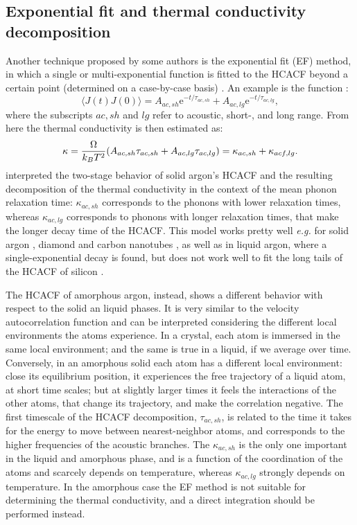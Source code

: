 \begin{LEtext}
\subsection{Exponential fit and thermal conductivity decomposition}
Another technique proposed by some authors is the exponential fit (EF) method, in which a single or multi-exponential function is fitted to the HCACF beyond a certain point (determined on a case-by-case basis) \cite{Che2000a,Li1998,Zhang2015}. An example is the function \cite{Che2000a}:
\begin{equation}
    \langle J(t) J(0) \rangle = A_{ac,sh} \mathrm{e}^{-t/\tau_{ac,sh}} + A_{ac,lg} \mathrm{e}^{-t/\tau_{ac,lg}},
\end{equation}
where the subscripts $ac,sh$ and $lg$ refer to acoustic, short-, and long range. From here the thermal conductivity is then estimated as:
\begin{equation}
    \kappa = \frac{{\mathrm\Omega}}{k_B T^2} (A_{ac,sh}\tau_{ac,sh} + A_{ac,lg}\tau_{ac,lg})  =  \kappa_{ac,sh} + \kappa_{acf,lg}.
\end{equation}
\citet{McGaughey2004a} interpreted the two-stage behavior of solid argon's HCACF and the resulting decomposition of the thermal conductivity in the context of the mean phonon relaxation time: $\kappa_{ac,sh}$ corresponds to the phonons with lower relaxation times, whereas $\kappa_{ac,lg}$ corresponds to phonons with longer relaxation times, that make the longer decay time of the HCACF.
This model works pretty well \emph{e.g.} for solid argon \cite{McGaughey2004a}, diamond and carbon nanotubes \cite{Che2000a,Che2000b}, as well as in liquid argon, where a single-exponential decay is found, but does not work well to fit the long tails of the HCACF of silicon \cite{Schelling2002}.

The HCACF of amorphous argon, instead, shows a different behavior with respect to the solid an liquid phases. It is very similar to the velocity autocorrelation function and can be interpreted considering the different local environments the atoms experience. In a crystal, each atom is immersed in the same local environment; and the same is true in a liquid, if we average over time. Conversely, in an amorphous solid each atom has a different local environment: close its equilibrium position, it experiences the free trajectory of a liquid atom, at short time scales; but at slightly larger times it feels the interactions of the other atoms, that change its trajectory, and make the correlation negative. 
The first timescale of the HCACF decomposition, $\tau_{ac,sh}$, is related to the time it takes for the energy to move between nearest-neighbor atoms, and corresponds to the higher frequencies of the acoustic branches. The $\kappa_{ac,sh}$ is the only one important in the liquid and amorphous phase, and is a function of the coordination of the atoms  and scarcely depends on temperature, whereas $\kappa_{ac,lg}$ strongly depends on temperature.
In the amorphous case the EF method is not suitable for determining the thermal conductivity, and a direct integration should be performed instead. 


\end{LEtext}
